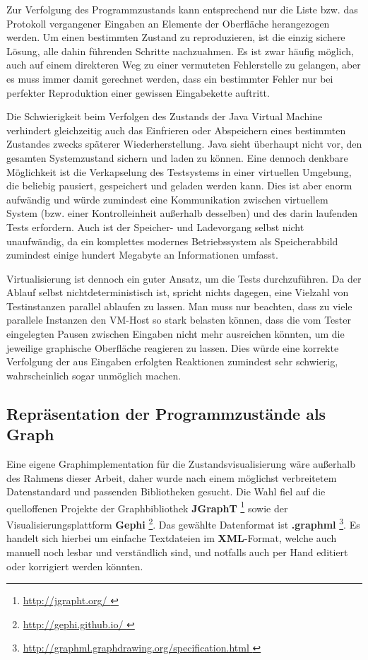 Zur Verfolgung des Programmzustands kann entsprechend nur die Liste
bzw. das Protokoll vergangener Eingaben an Elemente der Oberfläche
herangezogen werden. Um einen bestimmten Zustand zu reproduzieren,
ist die einzig sichere Lösung, alle dahin führenden Schritte nachzuahmen.
Es ist zwar häufig möglich, auch auf einem direkteren Weg zu einer
vermuteten Fehlerstelle zu gelangen, aber es muss immer damit gerechnet
werden, dass ein bestimmter Fehler nur bei perfekter Reproduktion
einer gewissen Eingabekette auftritt. 

Die Schwierigkeit beim
Verfolgen des Zustands der Java Virtual Machine verhindert
gleichzeitig auch das Einfrieren oder Abspeichern eines bestimmten Zustandes
zwecks späterer Wiederherstellung. Java sieht überhaupt nicht vor,
den gesamten Systemzustand sichern und laden zu können. Eine dennoch
denkbare Möglichkeit ist die Verkapselung des Testsystems in einer
virtuellen Umgebung, die beliebig pausiert, gespeichert und geladen
werden kann. Dies ist aber enorm aufwändig und würde zumindest eine
Kommunikation zwischen virtuellem System (bzw. einer Kontrolleinheit
außerhalb desselben) und des darin laufenden Tests erfordern.
Auch ist der Speicher- und Ladevorgang selbst nicht unaufwändig,
da ein komplettes modernes Betriebssystem als Speicherabbild zumindest einige hundert
Megabyte an Informationen umfasst.

Virtualisierung ist dennoch ein guter Ansatz, um die Tests
durchzuführen. Da der Ablauf selbst nichtdeterministisch ist,
spricht nichts dagegen, eine Vielzahl von Testinstanzen parallel ablaufen zu
lassen. Man muss nur beachten, dass zu viele parallele Instanzen den VM-Host
so stark belasten können, dass die vom Tester eingelegten Pausen
zwischen Eingaben nicht mehr ausreichen könnten, um die jeweilige graphische
Oberfläche reagieren zu lassen. Dies würde eine korrekte Verfolgung
der aus Eingaben erfolgten Reaktionen zumindest sehr schwierig,
wahrscheinlich sogar unmöglich machen.


\subsection{Repräsentation der Programmzustände als Graph}

Eine eigene Graphimplementation für die Zustandsvisualisierung wäre
außerhalb des Rahmens dieser Arbeit, daher wurde nach einem möglichst verbreitetem
Datenstandard und passenden Bibliotheken gesucht. Die Wahl fiel auf
die quelloffenen Projekte der Graphbibliothek \textbf{JGraphT} \footnote{\url{ http://jgrapht.org/ }} 
sowie der Visualisierungsplattform \textbf{Gephi} \footnote{\url{ http://gephi.github.io/ }}.
Das gewählte Datenformat ist \textbf{.graphml} \footnote{\url{ http://graphml.graphdrawing.org/specification.html }}.
Es handelt sich hierbei um einfache Textdateien im \textbf{XML}-Format,
welche auch manuell noch lesbar und verständlich sind, und notfalls
auch per Hand editiert oder korrigiert werden könnten. 

